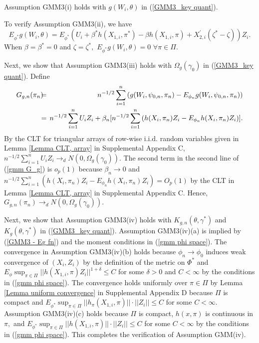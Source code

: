 \documentclass[12pt,thmsb,titlepage,final,oneside,letterpaper]{article}
\begin{document}
Assumption GMM3(i) holds with $g(W_{i},\theta )$ in (\ref{GMM3_key quant}).

To verify Assumption GMM3(ii), we have%
\begin{equation}
E_{\phi ^{\ast }}g(W_{i},\theta )=E_{\phi ^{\ast }}\left( U_{i}+\beta ^{\ast
}h(X_{1,i},\pi ^{\ast })-\beta h(X_{1,i},\pi )+X_{2,i}^{\prime }(\zeta
^{\ast }-\zeta )\right) Z_{i}.  \label{GMM3 - Eg fn}
\end{equation}%
When $\beta =\beta ^{\ast }=0$ and $\zeta =\zeta ^{\ast },$ $E_{\phi ^{\ast
}}g(W_{i},\theta )=0$ $\forall \pi \in \Pi .$

Next, we show that Assumption GMM3(iii) holds with $\Omega _{g}(\gamma _{0})$
in (\ref{GMM3_key quant}). Define 
\begin{eqnarray}
G_{g,n}(\pi _{n})\hspace{-0.08in} &=&\hspace{-0.08in}n^{-1/2}\sum_{i=1}^{n}%
\left( g(W_{i},\psi _{0,n},\pi _{n})-E_{\phi _{n}}g(W_{i},\psi _{0,n},\pi
_{n})\right)  \label{gmm G_g} \\
\hspace{-0.08in} &=&\hspace{-0.08in}n^{-1/2}\sum_{i=1}^{n}U_{i}Z_{i}+\beta
_{n}[n^{-1/2}\sum_{i=1}^{n}\left( h(X_{i},\pi _{n})Z_{i}-E_{\phi
_{n}}h(X_{i},\pi _{n})Z_{i}\right) ].  \notag
\end{eqnarray}%
By the CLT for triangular arrays of row-wise i.i.d. random variables given
in Lemma \ref{Lemma CLT, array} in Supplemental Appendix C, $%
n^{-1/2}\sum_{i=1}^{n}U_{i}Z_{i}\rightarrow _{d}N(0,\Omega _{g}(\gamma
_{0})).$ The second term in the second line of (\ref{gmm G_g}) is $o_{p}(1)$
because $\beta _{n}\rightarrow 0$ and $n^{-1/2}\sum_{i=1}^{n}(h(X_{i},\pi
_{n})Z_{i}-E_{\phi _{n}}h(X_{i},\allowbreak \pi _{n})Z_{i})=O_{p}(1)$ by the
CLT in Lemma \ref{Lemma CLT, array} in Supplemental Appendix C. Hence, $%
G_{g,n}(\pi _{n})\rightarrow _{d}N(0,\Omega _{g}(\gamma _{0})).$

Next, we show that Assumption GMM3(iv) holds with $K_{g,n}(\theta ,\gamma
^{\ast })$ and $K_{g}(\theta ,\gamma ^{\ast })$ in (\ref{GMM3_key quant}).
Assumption GMM3(iv)(a) is implied by (\ref{GMM3 - Eg fn}) and the moment
conditions in (\ref{gmm phi space}). The convergence in Assumption
GMM3(iv)(b) holds because $\phi _{n}\rightarrow \phi _{0}$ induces weak
convergence of $(X_{i},Z_{i})$ by the definition of the metric on $\Phi
^{\ast }$ and $E_{\phi }\sup_{\pi \in \Pi }||h(X_{1,i},\allowbreak \pi
)Z_{i}||^{1+\delta }\leq C$ for some $\delta >0$ and $C<\infty $ by the
conditions in (\ref{gmm phi space}). The convergence holds uniformly over $%
\pi \in \Pi $ by Lemma \ref{Lemma uniform convergence} in Supplemental
Appendix D because $\Pi $ is compact and $E_{\phi ^{\ast }}\sup_{\pi \in \Pi
}||h_{\pi }(X_{1,i},\pi )||\cdot ||Z_{i}||\leq C$ for some $C<\infty .$
Assumption GMM3(iv)(c) holds because $\Pi $ is compact, $h(x,\pi )$ is
continuous in $\pi ,$ and $E_{\phi ^{\ast }}\sup_{\pi \in \Pi
}||h(X_{1,i},\pi )||\cdot ||Z_{i}||\leq C$ for some $C<\infty $ by the
conditions in (\ref{gmm phi space}). This completes the verification of
Assumption GMM(iv).
\end{document}
